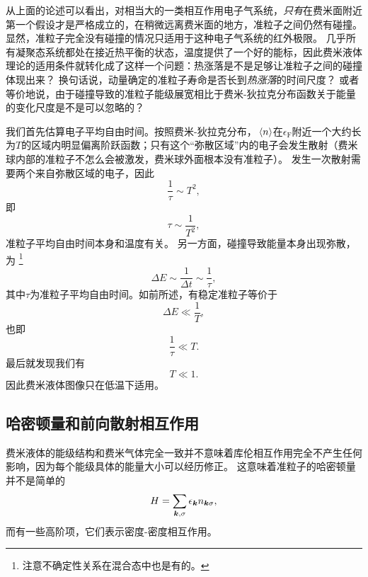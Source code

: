 从上面的论述可以看出，对相当大的一类相互作用电子气系统，\emph{只有}在费米面附近第一个假设才是严格成立的，在稍微远离费米面的地方，准粒子之间仍然有碰撞。
显然，准粒子完全没有碰撞的情况只适用于这种电子气系统的红外极限。
几乎所有凝聚态系统都处在接近热平衡的状态，温度提供了一个好的能标，因此费米液体理论的适用条件就转化成了这样一个问题：热涨落是不是足够让准粒子之间的碰撞体现出来？
换句话说，动量确定的准粒子寿命是否长到\emph{热涨落}的时间尺度？
或者等价地说，由于碰撞导致的准粒子能级展宽相比于费米-狄拉克分布函数关于能量的变化尺度是不是可以忽略的？

我们首先估算电子平均自由时间。按照费米-狄拉克分布，$\expval*{{n}}$在$\epsilon_\text{F}$附近一个大约长为$T$的区域内明显偏离阶跃函数；只有这个“弥散区域”内的电子会发生散射（费米球内部的准粒子不怎么会被激发，费米球外面根本没有准粒子）。
发生一次散射需要两个来自弥散区域的电子，因此
\[
    \frac{1}{\tau} \sim T^2,
\]
即
\begin{equation}
    \tau \sim \frac{1}{T^2},
\end{equation}
准粒子平均自由时间本身和温度有关。
另一方面，碰撞导致能量本身出现弥散，为%
\footnote{
    注意不确定性关系在混合态中也是有的。
}%
\[
    \Delta E \sim \frac{1}{\Delta t} \sim \frac{1}{\tau},
\]
其中$\tau$为准粒子平均自由时间。如前所述，有稳定准粒子等价于
\[
    \Delta E \ll \frac{1}{T},
\]
也即
\[
    \frac{1}{\tau} \ll T.
\]
最后就发现我们有
\begin{equation}
    T \ll 1.
\end{equation}
因此费米液体图像只在低温下适用。

\subsection{哈密顿量和前向散射相互作用}

费米液体的能级结构和费米气体完全一致并不意味着库伦相互作用完全不产生任何影响，因为每个能级具体的能量大小可以经历修正。
这意味着准粒子的哈密顿量并不是简单的
\[
    H = \sum_{\vb*{k}, \sigma} \epsilon_{\vb*{k}} n_{\vb*{k} \sigma},
\]
而有一些高阶项，它们表示密度-密度相互作用。

